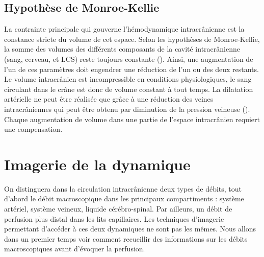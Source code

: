 \subsection{Hypothèse de Monroe-Kellie}
La contrainte principale qui gouverne l’hémodynamique intracrânienne est la constance stricte
du volume de cet espace. Selon les hypothèses de Monroe-Kellie, la somme des volumes des différents
composants de la cavité intracrânienne (sang, cerveau, et LCS) reste toujours constante (\cite{Carmelo2002}). Ainsi, une
augmentation de l’un de ces paramètres doit engendrer une réduction de l’un ou des deux restants.
Le volume intracrânien est incompressible en conditions physiologiques, le sang circulant dans le crâne
est donc de volume constant à tout temps. La dilatation artérielle ne peut être réalisée que grâce à
une réduction des veines intracrâniennes qui peut être obtenu par diminution de la pression veineuse
(\cite{Wei1982}). Chaque augmentation de volume dans une partie de l’espace intracrânien requiert une
compensation.
\section{Imagerie de la dynamique}
On distinguera dans la circulation intracrânienne deux types de débits, tout d’abord le débit
macroscopique dans les principaux compartiments : système artériel, système veineux, liquide
cérébro-spinal. Par ailleurs, un débit de perfusion plus distal dans les lits capillaires. Les techniques
d’imagerie permettant d’accéder à ces deux dynamiques ne sont pas les mêmes. Nous allons dans un
premier temps voir comment recueillir des informations sur les débits macroscopiques avant
d’évoquer la perfusion.

